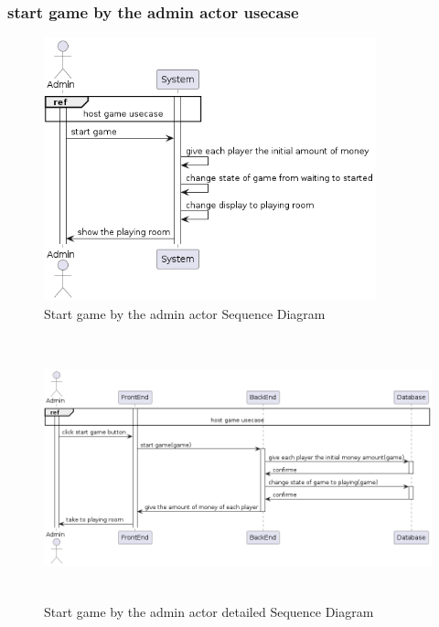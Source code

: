 \documentclass{article}
\begin{document}
\subsubsection{start game by the admin actor usecase}
 \begin{figure}[H]
	 \centering
	 \includegraphics[height=3in]{../thesis_tex/assets/diagrams/admin_start_game_SD.png}
	 \caption{Start game by the admin actor Sequence Diagram}
\end{figure}

 \begin{figure}[H]
	 \centering
	 \includegraphics[height=3in]{../thesis_tex/assets/diagrams/admin_start_game_detailedSD.png}
	 \caption{Start game by the admin actor detailed Sequence Diagram}
\end{figure}
\end{document}
